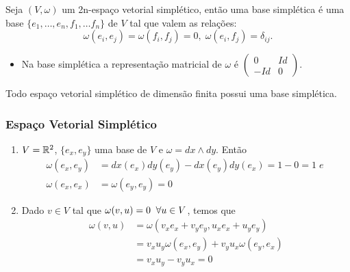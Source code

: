 \documentclass{beamer}
\begin{document}
\begin{footnotesize}
\begin{frame}
		\begin{definicao}
			Seja $(V, \omega)$ um 2n-espaço vetorial simplético, então uma base simplética é uma base $\{ e_{1},\dots, e_{n},f_{1},\dots f_{n}\}$ de $V$ tal que valem as relações:
			$$
			\omega(e_{i}, e_{j}) = \omega(f_{i}, f_{j}) = 0, \; \omega(e_{i}, f_{j}) = \delta_{ij}.
			$$
		\end{definicao}
		\begin{itemize}
			\item 	Na base simplética a representação matricial de $\omega$ é $\left(
			\begin{array}{cc}
			0 & Id
			\\
			-Id & 0
			\end{array}
			\right) $.
		\end{itemize}
		
			\begin{teorema}
				Todo espaço vetorial simplético de dimensão finita possui uma base simplética.
			\end{teorema}
	
	\end{frame}
	

	
	\begin{frame}
		\frametitle{Espaço Vetorial Simplético}
	\begin{exemplo}
			\begin{enumerate}
				\item $V = \mathbb{R}^{2}$, $\{e_{x}, e_{y}\}$ uma base de $V$ e $\omega=dx \wedge dy$. Então 
				$$
				\begin{aligned}
					\omega(e_{x}, e_{y}) &=dx(e_{x}) dy(e_{y}) - dx(e_{y}) dy(e_{x}) = 1-0= 1 \; e\; 
					\\
					\omega(e_{x}, e_{x}) &= \omega(e_{y}, e_{y}) = 0	
				\end{aligned}
				$$ 
				
				\item Dado $v \in V$ tal que $\omega(v, u)=0 \;\;\forall u \in V$, temos que 
				$$
				\begin{aligned}
					\omega(v, u) &= \omega(v_{x}e_{x}+v_{y}e_{y}, u_{x}e_{x}+u_{y}e_{y})
					\\
					&=
					v_{x}u_{y}\omega(e_{x}, e_{y}) +v_{y}u_{x}\omega(e_{y}, e_{x})
					\\
					&= v_{x}u_{y} -v_{y}u_{x} = 0
				\end{aligned}
				$$
				

\end{enumerate}
\end{exemplo}
\end{frame}
\end{footnotesize}
\end{document}
